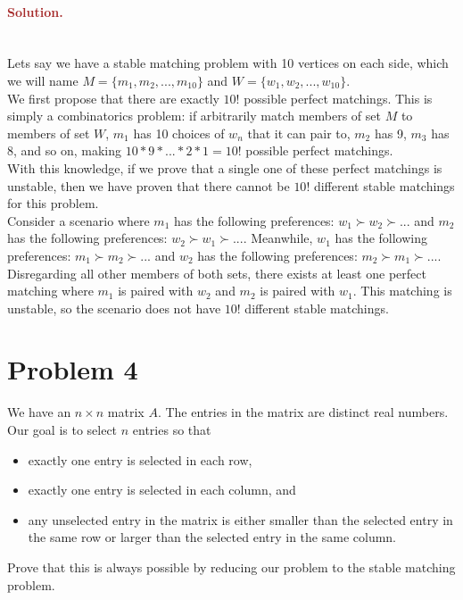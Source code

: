 \paragraph{\textcolor{brown}{Solution.}} \: \\
Lets say we have a stable matching problem with 10 vertices on each side, which we will name $M=\{m_1, m_2, ..., m_{10}\}$ and $W=\{w_1, w_2, ..., w_{10}\}$. 
\\We first propose that there are exactly $10!$ possible perfect matchings. This is simply a combinatorics problem: if arbitrarily match members of set $M$ to members of set $W$, $m_1$ has 10 choices of $w_n$ that it can pair to, $m_2$ has 9, $m_3$ has 8, and so on, making $10*9*...*2*1=10!$ possible perfect matchings.
\\With this knowledge, if we prove that a single one of these perfect matchings is unstable, then we have proven that there cannot be $10!$ different stable matchings for this problem.
\\Consider a scenario where $m_1$ has the following preferences: $w_1 \succ w_2 \succ ...$ and $m_2$ has the following preferences: $w_2 \succ w_1 \succ ...$. Meanwhile, $w_1$ has the following preferences: $m_1 \succ m_2 \succ ...$ and $w_2$ has the following preferences: $m_2 \succ m_1 \succ ...$. Disregarding all other members of both sets, there exists at least one perfect matching where $m_1$ is paired with $w_2$ and $m_2$ is paired with $w_1$. This matching is unstable, so the scenario does not have $10!$ different stable matchings.

\section*{Problem 4}
We have an $n \times n$ matrix $A$. The entries in the matrix are distinct real numbers. Our goal is to select $n$ entries so that
\begin{itemize}
    \item exactly one entry is selected in each row,
    \item exactly one entry is selected in each column, and
    \item any unselected entry in the matrix is either smaller than the selected entry in the same row or larger than the selected entry in the same column.
\end{itemize}
Prove that this is always possible by reducing our problem to the stable matching problem.

